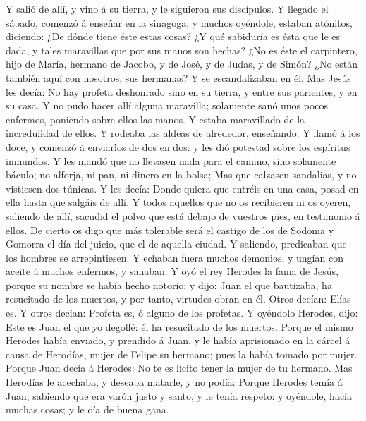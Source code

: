 Y salió de allí, y vino á su tierra, y le siguieron sus
discípulos.  Y llegado el sábado, comenzó á enseñar en la
sinagoga; y muchos oyéndole, estaban atónitos, diciendo: ¿De dónde tiene
éste estas cosas? ¿Y qué sabiduría es ésta que le es dada, y tales
maravillas que por sus manos son hechas?  ¿No es éste el
carpintero, hijo de María, hermano de Jacobo, y de José, y de Judas, y
de Simón? ¿No están también aquí con nosotros, sus hermanas? Y se
escandalizaban en él.  Mas Jesús les decía: No hay profeta
deshonrado sino en su tierra, y entre sus parientes, y en su casa.
 Y no pudo hacer allí alguna maravilla; solamente sanó
unos pocos enfermos, poniendo sobre ellos las manos.  Y
estaba maravillado de la incredulidad de ellos. Y rodeaba las aldeas de
alrededor, enseñando.  Y llamó á los doce, y comenzó á
enviarlos de dos en dos: y les dió potestad sobre los espíritus
inmundos.  Y les mandó que no llevasen nada para el
camino, sino solamente báculo; no alforja, ni pan, ni dinero en la
bolsa;  Mas que calzasen sandalias, y no vistiesen dos
túnicas.  Y les decía: Donde quiera que entréis en una
casa, posad en ella hasta que salgáis de allí.  Y todos
aquellos que no os recibieren ni os oyeren, saliendo de allí, sacudid el
polvo que está debajo de vuestros pies, en testimonio á ellos. De cierto
os digo que más tolerable será el castigo de los de Sodoma y Gomorra el
día del juicio, que el de aquella ciudad.  Y saliendo,
predicaban que los hombres se arrepintiesen.  Y echaban
fuera muchos demonios, y ungían con aceite á muchos enfermos, y sanaban.
 Y oyó el rey Herodes la fama de Jesús, porque su nombre
se había hecho notorio; y dijo: Juan el que bautizaba, ha resucitado de
los muertos, y por tanto, virtudes obran en él.  Otros
decían: Elías es. Y otros decían: Profeta es, ó alguno de los profetas.
 Y oyéndolo Herodes, dijo: Este es Juan el que yo
degollé: él ha resucitado de los muertos.  Porque el
mismo Herodes había enviado, y prendido á Juan, y le había aprisionado
en la cárcel á causa de Herodías, mujer de Felipe su hermano; pues la
había tomado por mujer.  Porque Juan decía á Herodes: No
te es lícito tener la mujer de tu hermano.  Mas Herodías
le acechaba, y deseaba matarle, y no podía:  Porque
Herodes temía á Juan, sabiendo que era varón justo y santo, y le tenía
respeto: y oyéndole, hacía muchas cosas; y le oía de buena gana.
